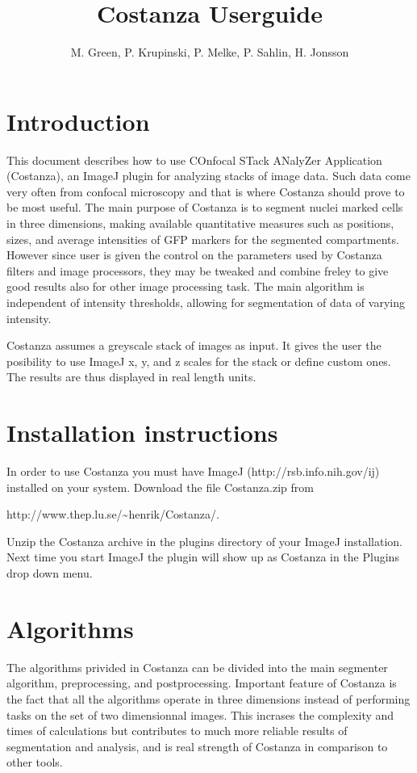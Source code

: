 \documentclass[a4paper,12pt]{article}
\title{Costanza Userguide}
\author{M. Green, P. Krupinski, P. Melke, P. Sahlin, H. Jonsson}
\begin{document}
\maketitle


\section{Introduction}

This document describes how to use COnfocal STack ANalyZer Application
(Costanza), an ImageJ\cite{Abramoff2004} plugin for analyzing
stacks of image data. Such data come very often from confocal microscopy and that is where Costanza should prove to be most useful. The main purpose of Costanza is to segment nuclei marked cells
in three dimensions, making available quantitative measures such as
positions, sizes, and average intensities of GFP markers for the
segmented compartments. However since user is given the control on the parameters used by Costanza filters and image processors, they may be tweaked and combine freley to give good results also for other image processing task. The main algorithm is independent of intensity
thresholds, allowing for segmentation of data of varying intensity.


Costanza assumes a greyscale stack of images as input. It gives the user the posibility to use ImageJ x, y, and z scales for the stack or define custom ones. The results are thus displayed in real length units. 
\section{Installation instructions}

In order to use Costanza you must have ImageJ
(http://rsb.info.nih.gov/ij) installed on your system. Download the
file Costanza.zip from

http://www.thep.lu.se/\~{}henrik/Costanza/. 

Unzip the Costanza archive in the plugins directory of your ImageJ
installation. Next time you start ImageJ the plugin will show up as Costanza
in the Plugins drop down menu.

\section{Algorithms}

The algorithms privided in Costanza can be divided into the main
segmenter algorithm, preprocessing, and postprocessing. Important feature of Costanza is the fact that all the algorithms operate in three dimensions instead of performing tasks on the set of two dimensionnal images. This incrases the complexity and times of calculations but contributes to much more reliable results of segmentation and analysis, and is real strength of Costanza in comparison to other tools.
\end{document}
